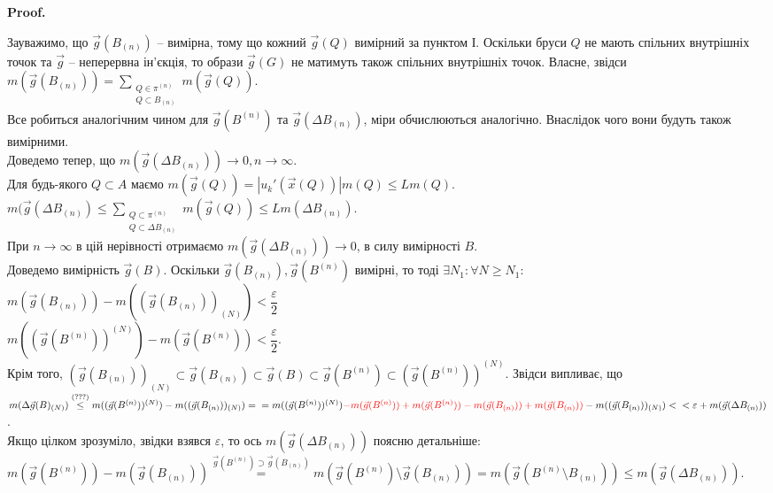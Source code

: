 \documentclass[a4paper, 10pt]{article}
\makeatletter
\def\qed{$\blacksquare$}
\theoremstyle{theoremdd}
\theoremstyle{theoremdd}
\theoremstyle{theoremdd}
\theoremstyle{theoremdd}
\theoremstyle{theoremdd}
\theoremstyle{theoremdd}
\theoremstyle{theoremdd}
\theoremstyle{theoremdd}
\theoremstyle{theoremdd}
\theoremstyle{theoremdd}
\theoremstyle{theoremdd}
\theoremstyle{theoremdd}
\theoremstyle{theoremdd}
\theoremstyle{theoremdd}
\theoremstyle{theoremdd}
\renewenvironment{proof}[1][Proof.\\]{\par
\pushQED{\hfill \qed}%
\normalfont \topsep6\p@\@plus6\p@\relax
\trivlist
\item\relax
{\bfseries
#1\@addpunct{.}}\hspace\labelsep\ignorespaces
}{%
\popQED\endtrivlist\@endpefalse
}
\makeatother
\begin{document}
\begin{proof}
Зауважимо, що $\vec{g}(B_{(n)})$ -- вимірна, тому що кожний $\vec{g}(Q)$ вимірний за пунктом І. Оскільки бруси $Q$ не мають спільних внутрішніх точок та $\vec{g}$ -- неперервна ін'єкція, то образи $\vec{g}(G)$ не матимуть також спільних внутрішніх точок. Власне, звідси\\
$m(\vec{g}(B_{(n)})) = \displaystyle\sum_{\substack{Q \in \pi^{(n)} \\ Q \subset B_{(n)}}} m(\vec{g}(Q))$.\\
Все робиться аналогічним чином для $\vec{g}(B^{(n)})$ та $\vec{g}(\Delta B_{(n)})$, міри обчислюються аналогічно. Внаслідок чого вони будуть також вимірними.\\
Доведемо тепер, що $m(\vec{g}(\Delta B_{(n)})) \to 0, n \to \infty$.\\
Для будь-якого $Q \subset A$ маємо $m(\vec{g}(Q)) = |u_k'(\vec{x}(Q))| m(Q) \leq Lm(Q)$.\\
$m(\vec{g}(\Delta B_{(n)}) \leq \displaystyle\sum_{\substack{Q \subset \pi^{(n)} \\ Q \subset \Delta B_{(n)}}} m(\vec{g}(Q)) \leq Lm(\Delta B_{(n)})$.\\
При $n \to \infty$ в цій нерівності отримаємо $m(\vec{g}(\Delta B_{(n)})) \to 0$, в силу вимірності $B$.
\bigskip \\
Доведемо вимірність $\vec{g}(B)$. Оскільки $\vec{g}(B_{(n)}), \vec{g}(B^{(n)})$ вимірні, то тоді $\exists N_1: \forall N \geq N_1:$\\
$m(\vec{g}(B_{(n)})) - m((\vec{g}(B_{(n)}))_{(N)}) < \dfrac{\varepsilon}{2}$\\
$m((\vec{g}(B^{(n)}))^{(N)}) - m(\vec{g}(B^{(n)})) < \dfrac{\varepsilon}{2}$.\\
Крім того, $( \vec{g}(B_{(n)}) )_{(N)} \subset \vec{g}(B_{(n)}) \subset \vec{g}(B) \subset \vec{g}(B^{(n)}) \subset ( \vec{g}(B^{(n)}) )^{(N)}$. Звідси випливає, що\\
$m(\Delta \vec{g}(B)_{(N)}) \overset{\text{(???)}}{\leq} m(( \vec{g}(B^{(n)}) )^{(N)}) - m(( \vec{g}(B_{(n)}) )_{(N)}) = \\
= m((\vec{g}(B^{(n)}))^{(N)}) \textcolor{red}{- m(\vec{g}(B^{(n)})) + m(\vec{g}(B^{(n)})) - m(\vec{g}(B_{(n)})) + m(\vec{g}(B_{(n)}))} - m((\vec{g}(B_{(n)}))_{(N)}) <\\ < \varepsilon + m(\vec{g}(\Delta B_{(n)}))$.\\
Якщо цілком зрозуміло, звідки взявся $\varepsilon$, то ось $m(\vec{g}(\Delta B_{(n)}))$ поясню детальніше:\\
$m(\vec{g}(B^{(n)})) - m(\vec{g}(B_{(n)})) \overset{\vec{g}(B^{(n)}) \supset \vec{g}(B_{(n)})}{=} m(\vec{g}(B^{(n)}) \setminus \vec{g}(B_{(n)})) = m(\vec{g}(B^{(n)} \setminus B_{(n)})) \leq m(\vec{g}(\Delta B_{(n)}))$.\\

\end{proof}
\end{document}
